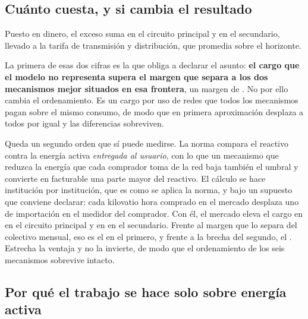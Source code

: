 \subsection{Cuánto cuesta, y si cambia el resultado}
\label{sub:anexo-cargo}

\begin{trampabox}
Puesto en dinero, el exceso suma  en el circuito
principal y  en el secundario, llevado a la tarifa de
transmisión y distribución, que promedia  sobre el
horizonte.

La primera de esas dos cifras es la que obliga a declarar el asunto:
\textbf{el cargo que el modelo no representa supera el margen que separa a
los dos mecanismos mejor situados en esa frontera}, un margen de . No por ello cambia el ordenamiento. Es un cargo por
uso de redes que todos los mecanismos pagan sobre el mismo consumo, de
modo que en primera aproximación desplaza a todos por igual y las
diferencias sobreviven.

Queda un segundo orden que sí puede medirse. La norma compara el reactivo
contra la energía activa \emph{entregada al usuario}, con lo que un mecanismo que reduzca la energía que cada comprador toma de la red baja
también el umbral y convierte en facturable una parte mayor del reactivo.
El cálculo se hace institución por institución, que es como se aplica la norma, y bajo un supuesto que conviene declarar: cada kilovatio hora
comprado en el mercado desplaza uno de importación en el medidor del
comprador. Con él, el mercado eleva el cargo en  en el
circuito principal y en  en el secundario. Frente al
margen que lo separa del colectivo mensual, eso es el  en el
primero, y frente a la brecha del segundo, el . Estrecha la
ventaja y no la invierte, de modo que el ordenamiento de los seis
mecanismos sobrevive intacto.
\end{trampabox}

\subsection{Por qué el trabajo se hace solo sobre energía activa}
\label{sub:anexo-porque}


